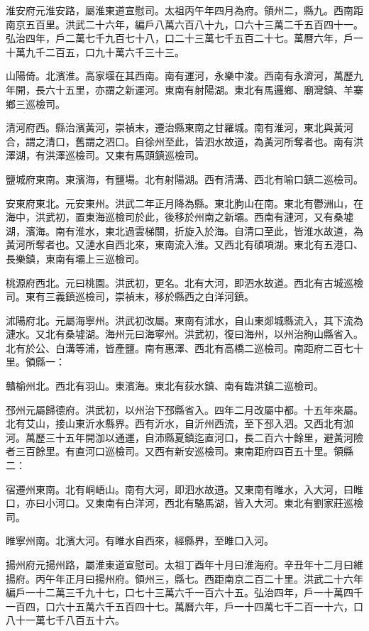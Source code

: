 淮安府元淮安路，屬淮東道宣慰司。太祖丙午年四月為府。領州二，縣九。西南距南京五百里。洪武二十六年，編戶八萬六百八十九，口六十三萬二千五百四十一。弘治四年，戶二萬七千九百七十八，口二十三萬七千五百二十七。萬曆六年，戶一十萬九千二百五，口九十萬六千三十三。

山陽倚。北濱淮。高家堰在其西南。南有運河，永樂中浚。西南有永濟河，萬歷九年開，長六十五里，亦謂之新運河。東南有射陽湖。東北有馬邏鄉、廟灣鎮、羊寨鄉三巡檢司。

清河府西。縣治濱黃河，崇禎末，遷治縣東南之甘羅城。南有淮河，東北與黃河合，謂之清口，舊謂之泗口。自徐州至此，皆泗水故道，為黃河所奪者也。南有洪澤湖，有洪澤巡檢司。又東有馬頭鎮巡檢司。

鹽城府東南。東濱海，有鹽場。北有射陽湖。西有清溝、西北有喻口鎮二巡檢司。

安東府東北。元安東州。洪武二年正月降為縣。東北朐山在南。東北有鬱洲山，在海中，洪武初，置東海巡檢司於此，後移於州南之新壩。西南有漣河，又有桑墟湖，濱海。南有淮水，東北過雲梯關，折旋入於海。自清口至此，皆淮水故道，為黃河所奪者也。又漣水自西北來，東南流入淮。又西北有碩項湖。東北有五港口、長樂鎮，東南有壩上三巡檢司。

桃源府西北。元曰桃園。洪武初，更名。北有大河，即泗水故道。西北有古城巡檢司。東有三義鎮巡檢司，崇禎末，移於縣西之白洋河鎮。

沭陽府北。元屬海寧州。洪武初改屬。東南有沭水，自山東郯城縣流入，其下流為漣水。又北有桑墟湖。海州元曰海寧州。洪武初，復曰海州，以州治朐山縣省入。北有於公、白溝等浦，皆產鹽。南有惠澤、西北有高橋二巡檢司。南距府二百七十里。領縣一：

贛榆州北。西北有羽山。東濱海。東北有荻水鎮、南有臨洪鎮二巡檢司。

邳州元屬歸德府。洪武初，以州治下邳縣省入。四年二月改屬中都。十五年來屬。北有艾山，接山東沂水縣界。西有沂水，自沂州西流，至下邳入泗。又西北有泇河。萬歷三十五年開泇以通運，自沛縣夏鎮迄直河口，長二百六十餘里，避黃河險者三百餘里。有直河口巡檢司。又西有新安巡檢司。東南距府四百五十里。領縣二：

宿遷州東南。北有峒峿山。南有大河，即泗水故道。又東南有睢水，入大河，曰睢口，亦曰小河口。又東南有白洋河，西北有駱馬湖，皆入大河。東北有劉家莊巡檢司。

睢寧州南。北濱大河。有睢水自西來，經縣界，至睢口入河。

揚州府元揚州路，屬淮東道宣慰司。太祖丁酉年十月曰淮海府。辛丑年十二月曰維揚府。丙午年正月曰揚州府。領州三，縣七。西距南京二百二十里。洪武二十六年編戶一十二萬三千九十七，口七十三萬六千一百六十五。弘治四年，戶一十萬四千一百四，口六十五萬六千五百四十七。萬曆六年，戶一十四萬七千二百一十六，口八十一萬七千八百五十六。

